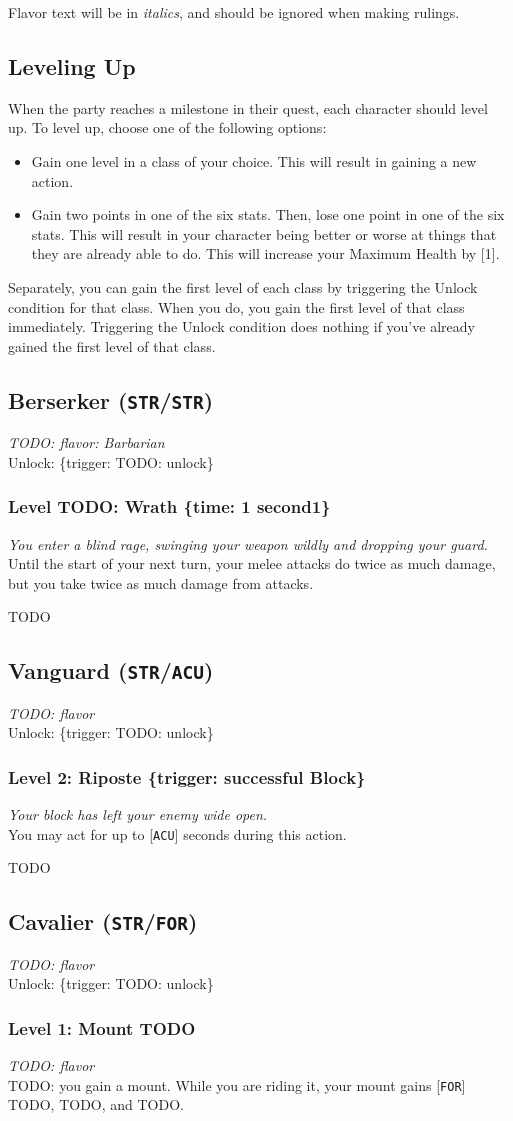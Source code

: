 \documentclass[12pt]{article}
\newcommand{\STR}{\texttt{STR}}
\newcommand{\ACU}{\texttt{ACU}}
\newcommand{\FOR}{\texttt{FOR}}
\newcommand{\TIME}[1]{\{time: #1 second\if1#1{}\else{s}\fi\}}
\newcommand{\TRIG}[1]{\{trigger: #1\}}
\newcommand{\Class}[4]{\pagebreak\subsection{#1 (#2)}\label{#1}\textit{#3}\\[1mm]Unlock: \TRIG{#4}}
\newcommand{\Skill}[5]{\subsubsection{Level #1: #2 #3}\textit{#4}\\[1mm]#5}
\begin{document}
Flavor text will be in \textit{italics}, and should be ignored when making rulings.

\subsection{Leveling Up}

When the party reaches a milestone in their quest, each character should level up. To level up, choose one of the following options:
\begin{itemize}
\item Gain one level in a class of your choice. This will result in gaining a new action.
\item Gain two points in one of the six stats. Then, lose one point in one of the six stats. This will result in your character being better or worse at things that they are already able to do. This will increase your Maximum Health by [1].
\end{itemize}

Separately, you can gain the first level of each class by triggering the Unlock condition for that class. When you do, you gain the first level of that class immediately. Triggering the Unlock condition does nothing if you've already gained the first level of that class.

%

\Class{Berserker}{\STR/\STR}
{TODO: flavor: Barbarian}
{TODO: unlock}

\Skill{TODO}{Wrath}{\TIME{1}}
{You enter a blind rage, swinging your weapon wildly and dropping your guard.}
{Until the start of your next turn, your melee attacks do twice as much damage, but you take twice as much damage from attacks.}

TODO

%

%

%

\Class{Vanguard}{\STR/\ACU}
{TODO: flavor}
{TODO: unlock}

\Skill{2}{Riposte}{\TRIG{successful Block}}
{Your block has left your enemy wide open.}
{You may act for up to [\ACU] seconds during this action.}

TODO

%

%

\Class{Cavalier}{\STR/\FOR}
{TODO: flavor}
{TODO: unlock}

\Skill{1}{Mount}{TODO}
{TODO: flavor}
{TODO: you gain a mount. While you are riding it, your mount gains [\FOR] TODO, TODO, and TODO.}
\end{document}
